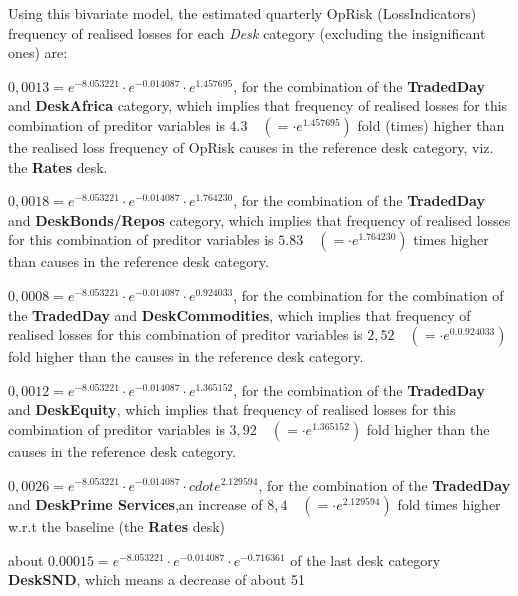 \documentclass{DissertateUSU}
\begin{document}
\singlespacing

\doublespacing

Using this bivariate model, the estimated quarterly OpRisk
(LossIndicators) frequency of realised losses for each \emph{Desk}
category (excluding the insignificant ones) are:

\begin{list}{*}{}
\item $0,0013 = e^{-8.053221}\cdot e^{-0.014087}\cdot e^{1.457695}$, for the combination of the \textbf{TradedDay} and \textbf{DeskAfrica} category, which implies that frequency of realised losses for this combination of preditor variables is $4.3 \quad (=\cdot e^{1.457695})$ fold (times) higher than the realised loss frequency of OpRisk causes in the reference desk category, viz. the \textbf{Rates} desk. 
\item $0,0018 = e^{-8.053221}\cdot e^{-0.014087}\cdot e^{1.764230}$, for the combination of the \textbf{TradedDay} and \textbf{DeskBonds/Repos} category, which implies that frequency of realised losses for this combination of preditor variables is $5.83 \quad (=\cdot e^{1.764230})$ times higher than causes in the reference desk category.
\item $0,0008 = e^{-8.053221}\cdot e^{-0.014087}\cdot  e^{0.924033}$, for the combination  for the combination of the \textbf{TradedDay} and \textbf{DeskCommodities}, which implies that frequency of realised losses for this combination of preditor variables is $2,52 \quad (=\cdot e^{0.0.924033})$ fold higher than the causes in the reference desk category.
\item $0,0012 = e^{-8.053221}\cdot e^{-0.014087}\cdot  e^{1.365152}$, for the combination of the \textbf{TradedDay} and \textbf{DeskEquity}, which implies that frequency of realised losses for this combination of preditor variables is $3,92 \quad (=\cdot e^{1.365152})$ fold higher than the causes in the reference desk category.
\item $0,0026 = e^{-8.053221}\cdot e^{-0.014087}\cdot cdot e^{2.129594}$, for the combination of the \textbf{TradedDay} and \textbf{DeskPrime Services},an increase of $8,4 \quad (=\cdot e^{2.129594})$ fold times higher w.r.t the baseline (the \textbf{Rates} desk)
\item about $0.00015 = e^{-8.053221}\cdot e^{-0.014087}\cdot  e^{-0.716361}$ of the last desk category \textbf{DeskSND}, which means a decrease of about 51%
\end{list}
\end{document}
